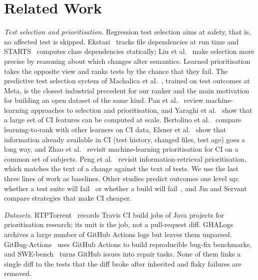 \documentclass[10pt,conference]{IEEEtran}
\begin{document}
\section{Related Work}
\label{sec:related}

\textit{Test selection and prioritisation.} Regression test selection aims at safety, that is, no affected test is skipped. Ekstazi~\cite{gligoric2015practical} tracks file dependencies at run time and STARTS~\cite{legunsen2017starts} computes class dependencies statically; Liu et al.~\cite{liu2023more} make selection more precise by reasoning about which changes alter semantics. Learned prioritisation takes the opposite view and ranks tests by the chance that they fail. The predictive test selection system of Machalica et al.~\cite{machalica2019predictive}, trained on test outcomes at Meta, is the closest industrial precedent for our ranker and the main motivation for building an open dataset of the same kind. Pan et al.~\cite{pan2022test} review machine-learning approaches to selection and prioritisation, and Yaraghi et al.~\cite{yaraghi2022scalable} show that a large set of CI features can be computed at scale. Bertolino et al.~\cite{bertolino2020learning} compare learning-to-rank with other learners on CI data, Elsner et al.~\cite{elsner2021empirically} show that information already available in CI (test history, changed files, test age) goes a long way, and Zhao et al.~\cite{zhao2023revisiting} revisit machine-learning prioritisation for CI on a common set of subjects. Peng et al.~\cite{peng2020empirically} revisit information-retrieval prioritisation, which matches the text of a change against the text of tests. We use the last three lines of work as baselines. Other studies predict outcomes one level up: whether a test suite will fail~\cite{pan2021continuous} or whether a build will fail~\cite{sun2024ravenbuild}, and Jin and Servant~\cite{jin2021what} compare strategies that make CI cheaper.

\textit{Datasets.} RTPTorrent~\cite{mattis2020rtptorrent} records Travis CI build jobs of Java projects for prioritisation research; its unit is the job, not a pull-request diff. GHALogs~\cite{moriconi2025ghalogs} archives a large number of GitHub Actions logs but leaves them unparsed. GitBug-Actions~\cite{saavedra2024gitbug} uses GitHub Actions to build reproducible bug-fix benchmarks, and SWE-bench~\cite{jimenez2024swebench} turns GitHub issues into repair tasks. None of them links a single diff to the tests that the diff broke after inherited and flaky failures are removed.
\end{document}
